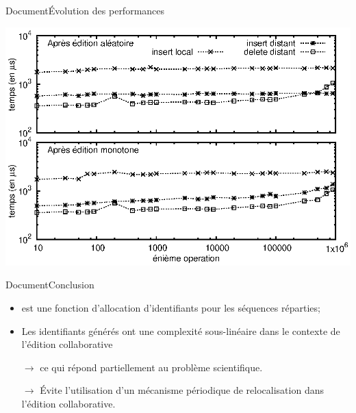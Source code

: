 \begin{frame}{Document}{Évolution des performances}

  \begin{center}
    \includegraphics[width=\textwidth]{img/replication/time.eps}
  \end{center}

\end{frame}


\begin{frame}{Document}{Conclusion}

  \begin{itemize}
  \item \LSEQ est une fonction d'allocation d'identifiants pour les séquences
    réparties;
  \item Les identifiants générés ont une complexité sous-linéaire dans le contexte
    de l'édition collaborative
  \item [$\rightarrow$] ce qui répond partiellement au problème scientifique.
  \item [$\rightarrow$] Évite l'utilisation d'un mécanisme périodique de
    relocalisation dans l'édition collaborative.
  \end{itemize}


  

\end{frame}



